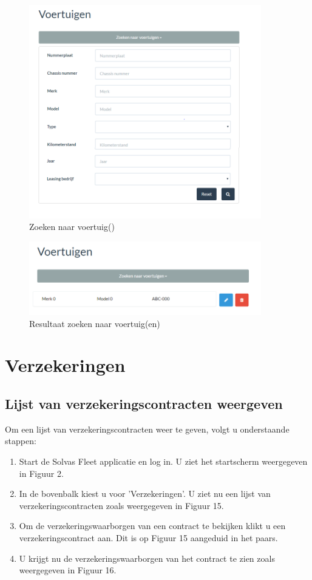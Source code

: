 \documentclass[11pt,openany]{article}
\begin{document}
\begin{figure}
	\centering
	\includegraphics[width=0.9\textwidth]{img/fig_m.png}
	\caption{Zoeken naar voertuig()}
\end{figure}

\begin{figure}
	\centering
	\includegraphics[width=0.9\textwidth]{img/fig_n.png}
	\caption{Resultaat zoeken naar voertuig(en)}
\end{figure}

\section{Verzekeringen}
\subsection{Lijst van verzekeringscontracten weergeven}
Om een lijst van verzekeringscontracten weer te geven, volgt u onderstaande stappen:
\begin{enumerate}
	\item Start de Solvas Fleet applicatie en log in. U ziet het startscherm weergegeven in Figuur 2.
	\item In de bovenbalk kiest u voor 'Verzekeringen'. U ziet nu een lijst van verzekeringscontracten zoals weergegeven in Figuur 15.
	\item Om de verzekeringswaarborgen van een contract te bekijken klikt u een verzekeringscontract aan. Dit is op Figuur 15 aangeduid in het paars.
	\item U krijgt nu de verzekeringswaarborgen van het contract te zien zoals weergegeven in Figuur 16.
\end{enumerate}
\end{document}
